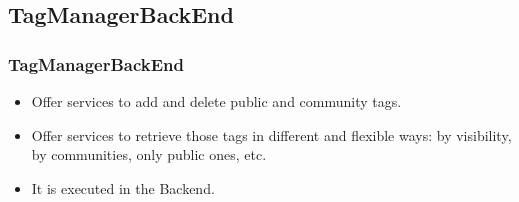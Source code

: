 \subsection{TagManagerBackEnd}

\begin{frame}

\frametitle{TagManagerBackEnd}

	\begin{itemize}
		\item Offer services to add and delete public and community tags.
		\item Offer services to retrieve those tags in different and 
			flexible ways: by visibility, by communities, only public ones, etc.
		
	
		\item It is executed in the Backend.

	\end{itemize}

\end{frame}


